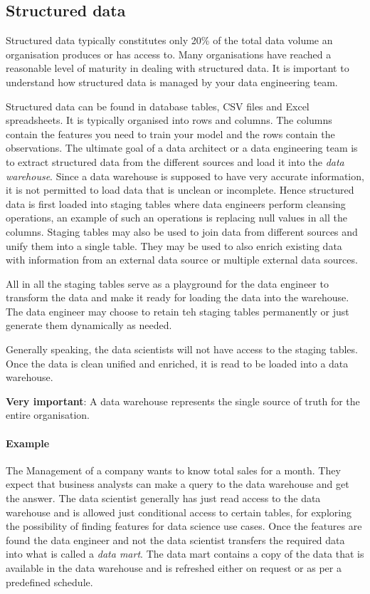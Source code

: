 \subsection{Structured data}

Structured data typically constitutes only 20\% of the total data volume an organisation produces or has access to.
Many organisations have reached a reasonable level of maturity in dealing with structured data.
It is important to understand how structured data is managed by your data engineering team.

Structured data can be found in database tables, CSV files and Excel spreadsheets.
It is typically organised into rows and columns.
The columns contain the features you need to train your model and the rows contain the observations.
The ultimate goal of a data architect or a data engineering team is to extract structured data from the different sources and load it into the \textit{data warehouse}.
Since a data warehouse is supposed to have very accurate information, it is not permitted to load data that is unclean or incomplete.
Hence structured data is first loaded into staging tables where data engineers perform cleansing operations, an example of such an operations is replacing null values in all the columns.
Staging tables may also be used to join data from different sources and unify them into a single table.
They may be used to also enrich existing data with information from an external data source or multiple external data sources.

All in all the staging tables serve as a playground for the data engineer to transform the data and make it ready for loading the data into the warehouse.
The data engineer may choose to retain teh staging tables permanently or just generate them dynamically as needed.

Generally speaking, the data scientists will not have access to the staging tables.
Once the data is clean unified and enriched, it is read to be loaded into a data warehouse.

\begin{note}
    \textbf{Very important}: A data warehouse represents the single source of truth for the entire organisation.
\end{note}

\paragraph{Example}
The Management of a company wants to know total sales for a month.
They expect that business analysts can make a query to the data warehouse and get the answer.
The data scientist generally has just read access to the data warehouse and is allowed just conditional access to certain tables, for exploring the possibility of finding features for data science use cases.
Once the features are found the data engineer and not the data scientist transfers the required data into what is called a \textit{data mart}.
The data mart contains a copy of the data that is available in the data warehouse and is refreshed either on request or as per a predefined schedule.

